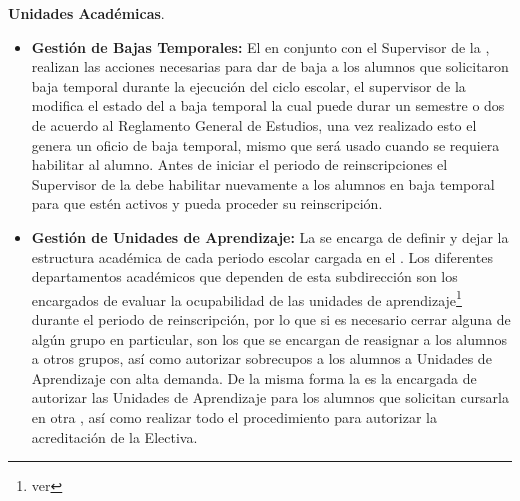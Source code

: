 \begin{ADescripcion}
	\item \textbf{Unidades Académicas}.
	
	\begin{itemize}

	 
	\item \textbf{Gestión de Bajas Temporales:} El  en conjunto con el Supervisor de la , realizan las acciones necesarias para dar de baja a los alumnos que solicitaron baja temporal durante la ejecución del ciclo escolar, el supervisor de la  modifica el estado del  a baja temporal la cual puede durar un semestre o dos de acuerdo al Reglamento General de Estudios, una vez realizado esto el  genera un oficio de baja temporal, mismo que será usado cuando se requiera habilitar al alumno. Antes de iniciar el periodo de reinscripciones el Supervisor de la  debe habilitar nuevamente a los alumnos en baja temporal para que estén activos y pueda proceder su reinscripción.\\
	
	\item \textbf{Gestión de Unidades de Aprendizaje:} La  se encarga de definir y dejar la estructura académica de cada periodo escolar cargada en el . Los diferentes departamentos académicos que dependen de esta subdirección son los encargados de evaluar la ocupabilidad de las unidades de aprendizaje\footnote{ver } durante el periodo de reinscripción, por lo que si es necesario cerrar alguna  de algún grupo en particular, son los que se encargan de reasignar a los alumnos a otros grupos, así como autorizar sobrecupos a los alumnos a Unidades de Aprendizaje con alta demanda. De la misma forma la  es la encargada de autorizar las Unidades de Aprendizaje para los alumnos que solicitan cursarla en otra  , así como realizar todo el procedimiento para autorizar la acreditación de la  Electiva.
	\\


\end{itemize}
\end{ADescripcion}
